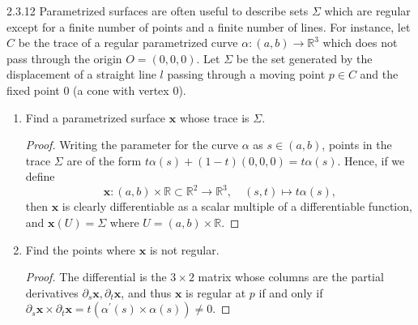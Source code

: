 \documentclass[11pt]{article}
\begin{document}
\begin{problem}{2.3.12}
	Parametrized surfaces are often useful to describe sets \(\Sigma\) which are regular except for a finite number of points and a finite number of lines.
	For instance, let \( C \) be the trace of a regular parametrized curve \(\alpha: (a,b) \rightarrow \mathbb{R}^3\) which does not pass through the origin \( O = (0,0,0) \).
	Let \(\Sigma\) be the set generated by the displacement of a straight line \( l \) passing through a moving point \( p \in C \) and the fixed point \( 0 \) (a cone with vertex \( 0 \)).
	\begin{enumerate}[label=(\alph*)]
		\item Find a parametrized surface \( \mathbf{x} \) whose trace is \(\Sigma\).
          \begin{proof}
            Writing the parameter for the curve \(\alpha\) as \( s \in (a,b) \), points in the trace \(\Sigma\) are of the form \( t\alpha(s) + (1-t)(0,0,0) = t \alpha(s) \).
            Hence, if we define
            \begin{equation}
            \label{eq:16}
            \mathbf{x}: (a,b) \times \mathbb{R} \subset \mathbb{R}^2 \rightarrow \mathbb{R}^3, \quad (s, t) \mapsto t \alpha(s),
            \end{equation}
            then \( \mathbf{x} \) is clearly differentiable as a scalar multiple of a differentiable function, and \( \mathbf{x}(U) = \Sigma \) where \( U = (a,b) \times \mathbb{R} \).
          \end{proof}
		\item Find the points where \( \mathbf{x} \) is not regular.
          \begin{proof}
            The differential is the \( 3 \times 2 \) matrix whose columns are the partial derivatives \( \partial_s\mathbf{x}, \partial_t\mathbf{x} \), and thus \( \mathbf{x} \) is regular at \( p \) if and only if \(\partial_s\mathbf{x} \times \partial_t\mathbf{x} = t(\alpha^{\prime}(s) \times \alpha(s))\neq 0\).


\end{proof}
\end{enumerate}
\end{problem}
\end{document}
